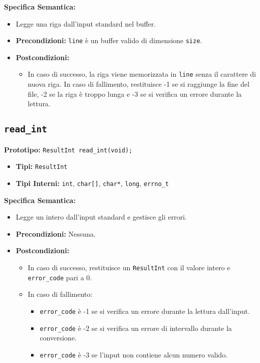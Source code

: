 \documentclass{article}
\begin{document}
\flushleft
\textbf{Specifica Semantica:}
\begin{itemize}[label=--,leftmargin=*]
    \item Legge una riga dall'input standard nel buffer.
    \item \textbf{Precondizioni:} \texttt{line} è un buffer valido di dimensione \texttt{size}.
    \item \textbf{Postcondizioni:}
    \begin{itemize}[label=--,leftmargin=*]
        \item In caso di successo, la riga viene memorizzata in \texttt{line} senza il carattere di nuova riga. In caso di fallimento, restituisce -1 se si raggiunge la fine del file, -2 se la riga è troppo lunga e -3 se si verifica un errore durante la lettura.
    \end{itemize}
\end{itemize}

\subsection{\texttt{read\_int}}
\textbf{Prototipo:} \texttt{ResultInt read\_int(void);}

\begin{itemize}[label=--,leftmargin=*]
    \item \textbf{Tipi:} \texttt{ResultInt}
    \item \textbf{Tipi Interni:} \texttt{int}, \texttt{char[]}, \texttt{char*}, \texttt{long}, \texttt{errno\_t}
\end{itemize}

\flushleft
\textbf{Specifica Semantica:}
\begin{itemize}[label=--,leftmargin=*]
    \item Legge un intero dall'input standard e gestisce gli errori.
    \item \textbf{Precondizioni:} Nessuna.
    \item \textbf{Postcondizioni:}
    \begin{itemize}[label=--,leftmargin=*]
        \item In caso di successo, restituisce un \texttt{ResultInt} con il valore intero e \texttt{error\_code} pari a 0.
        \item In caso di fallimento:
        \begin{itemize}[label=--,leftmargin=*]
            \item \texttt{error\_code} è -1 se si verifica un errore durante la lettura dall'input.
            \item \texttt{error\_code} è -2 se si verifica un errore di intervallo durante la conversione.
            \item \texttt{error\_code} è -3 se l'input non contiene alcun numero valido.
        \end{itemize}
    \end{itemize}
\end{itemize}
\end{document}
